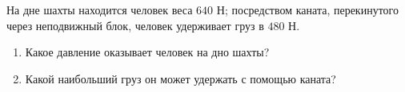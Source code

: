 На дне шахты находится человек веса $640$ Н; посредством каната,
перекинутого через неподвижный блок, человек удерживает груз в $480$ Н.
\begin{enumerate}
\item Какое давление оказывает человек на дно шахты?
\item Какой наибольший груз он может удержать с помощью каната?
\end{enumerate}
